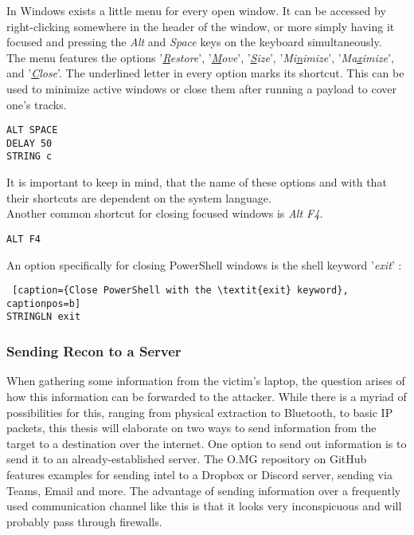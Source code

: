 In Windows exists a little menu for every open window. It can be accessed by right-clicking somewhere in the header of the window, or more simply having it focused and pressing the \textit{Alt} and \textit{Space} keys on the keyboard simultaneously. \\
The menu features the options '\textit{\underline{R}estore}', '\textit{\underline{M}ove}', '\textit{\underline{S}ize}', '\textit{Mi\underline{n}imize}', '\textit{Ma\underline{x}imize}', and '\textit{\underline{C}lose}'. The underlined letter in every option marks its shortcut. This can be used to minimize active windows or close them after running a payload to cover one's tracks.
\begin{lstlisting}[caption={Close a window through its window menu}, captionpos=b]
ALT SPACE
DELAY 50
STRING c
\end{lstlisting}
It is important to keep in mind, that the name of these options and with that their shortcuts are dependent on the system language. \\
Another common shortcut for closing focused windows is \textit{Alt F4}.
\begin{lstlisting}[caption={Close a window with ALT F4}, captionpos=b]
ALT F4
\end{lstlisting}


An option specifically for closing PowerShell windows is the shell keyword '\textit{exit}' :
\begin{lstlisting} [caption={Close PowerShell with the \textit{exit} keyword}, captionpos=b]
STRINGLN exit
\end{lstlisting}


\subsubsection{Sending Recon to a Server}

When gathering some information from the victim's laptop, the question arises of how this information can be forwarded to the attacker. While there is a myriad of possibilities for this, ranging from physical extraction to Bluetooth, to basic IP packets, this thesis will elaborate on two ways to send information from the target to a destination over the internet.
One option to send out information is to send it to an already-established server. The O.MG repository on GitHub features examples for sending intel to a Dropbox or Discord server, sending via Teams, Email and more. The advantage of sending information over a frequently used communication channel like this is that it looks very inconspicuous and will probably pass through firewalls.\\


